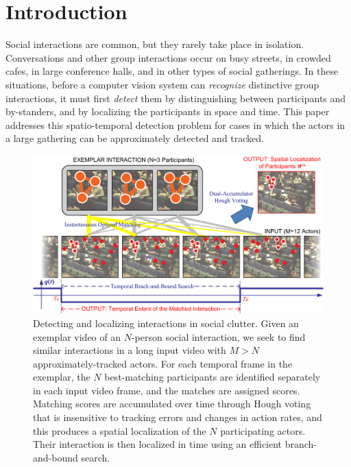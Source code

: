 \section{Introduction}

Social interactions are common, but they rarely take place in isolation. Conversations and other group interactions occur on busy streets, in crowded cafes, in large conference halls, and in other types of social gatherings. In these situations, before a computer vision system can \emph{recognize} distinctive group interactions, it must first \emph{detect} them by distinguishing between participants and by-standers, and by localizing the participants in space and time. This paper addresses this spatio-temporal detection problem for cases in which the actors in a large gathering can be approximately detected and tracked.

\begin{figure}[t]
\begin{center}
\includegraphics[width=\columnwidth]{diagram2.png}
\end{center}
\caption{Detecting and localizing interactions in social clutter. Given an exemplar video of an $N$-person social interaction, we seek to find similar interactions in a long input video with $M>N$ approximately-tracked actors. For each temporal frame in the exemplar, the $N$ best-matching participants are identified separately in each input video frame, and the matches are assigned scores. Matching scores are accumulated over time through Hough voting that is insensitive to tracking errors and changes in action rates, and this produces a spatial localization of the $N$ participating actors. Their interaction is then localized in time using an efficient branch-and-bound search.}
\label{diagram}
\end{figure}


